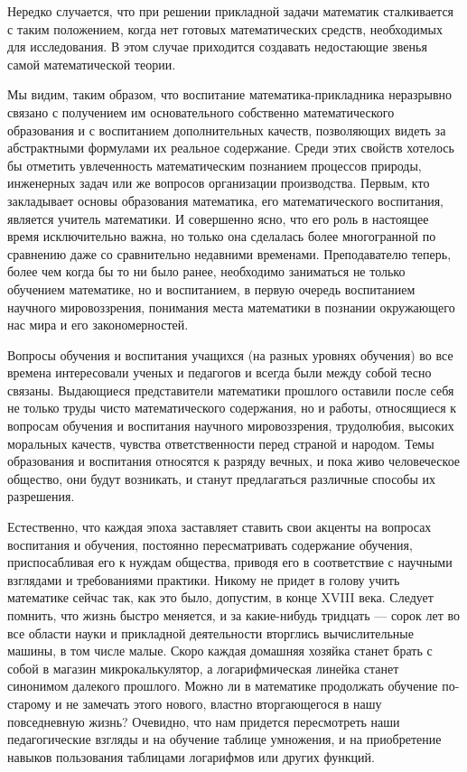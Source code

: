 \documentclass[12pt, a4paper, openany]{book}
\begin{document}
Нередко случается, что при решении прикладной задачи математик сталкивается с таким положением, когда нет готовых математических средств, необходимых для исследования. В этом случае приходится создавать недостающие звенья самой математической теории. 

Мы видим, таким образом, что воспитание математика-прикладника неразрывно связано с получением им основательного собственно математического образования и с воспитанием дополнительных качеств, позволяющих видеть за абстрактными формулами их реальное содержание. Среди этих свойств хотелось бы отметить увлеченность математическим познанием процессов природы, инженерных задач или же вопросов организации производства. Первым, кто закладывает основы образования математика, его математического воспитания, является учитель математики. И совершенно ясно, что его роль в настоящее время исключительно важна, но только она сделалась более многогранной по сравнению даже со сравнительно недавними временами. Преподавателю теперь, более чем когда бы то ни было ранее, необходимо заниматься не только обучением математике, но и воспитанием, в первую очередь воспитанием научного мировоззрения, понимания места математики в познании окружающего нас мира и его закономерностей. 

Вопросы обучения и воспитания учащихся (на разных уровнях обучения) во все времена интересовали ученых и педагогов и всегда были между собой тесно связаны. Выдающиеся представители математики прошлого  оставили после себя не только труды чисто математического  содержания, но и работы, относящиеся к вопросам  обучения и воспитания научного мировоззрения, трудолюбия, высоких моральных качеств, чувства ответственности перед страной и народом. Темы образования и воспитания  относятся к разряду вечных, и пока живо человеческое  общество, они будут возникать, и станут предлагаться различные способы их разрешения. 

Естественно, что каждая эпоха заставляет ставить свои акценты на вопросах воспитания и обучения, постоянно пересматривать содержание обучения, приспосабливая его к нуждам общества, приводя его в соответствие с  научными взглядами и требованиями практики. Никому не придет в голову учить математике сейчас так, как это было, допустим, в конце XVIII века. Следует помнить, что жизнь быстро меняется, и за какие-нибудь тридцать — сорок лет во все области науки и прикладной деятельности вторглись вычислительные машины, в том числе малые. Скоро каждая домашняя хозяйка станет брать с собой в магазин  микрокалькулятор, а логарифмическая линейка станет  синонимом далекого прошлого. Можно ли в математике  продолжать обучение по-старому и не замечать этого нового,  властно вторгающегося в нашу повседневную жизнь? Очевидно, что нам придется пересмотреть наши педагогические  взгляды и на обучение таблице умножения, и на приобретение навыков пользования таблицами логарифмов или других функций. 
\end{document}
